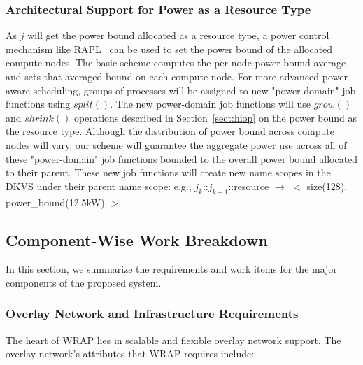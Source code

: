 \subsubsection{Architectural Support for Power as a Resource Type}
As $j$ will get the power bound allocated as a resource type,
a power control mechanism like RAPL~\cite{RountreeRAPL} can be used
to set the power bound of the allocated compute nodes.
The basic scheme computes the per-node power-bound average
and sets that averaged bound on each compute node.
For more advanced power-aware scheduling, groups of processes will
be assigned to new "power-domain" job functions using $split()$.
The new power-domain job functions will use $grow()$ and $shrink()$
operations described in Section~\ref{sect:hiop}
on the power bound as the resource type.
Although the distribution of power bound across compute
nodes will vary, our scheme will guarantee the aggregate power use
across all of these "power-domain" job functions bounded to the overall power bound
allocated to their parent.
These new job functions will create new name scopes
in the DKVS under their parent name scope:
e.g., $j_k$::$j_{k+1}$::resource $\rightarrow$ $<$ size(128), power\_bound(12.5kW) $>$.

\subsection{Component-Wise Work Breakdown}
In this section, we summarize the requirements and work items for
the major components of the proposed system.

\subsubsection{Overlay Network and Infrastructure Requirements}
The heart of WRAP lies in scalable and flexible overlay network support.
The overlay network's attributes that WRAP requires include:

